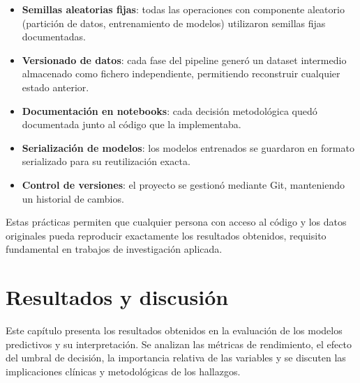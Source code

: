 \documentclass[12pt, a4paper, oneside]{report}
\begin{document}
\begin{itemize}
    \item \textbf{Semillas aleatorias fijas}: todas las operaciones con componente aleatorio (partición de datos, entrenamiento de modelos) utilizaron semillas fijas documentadas.
    \item \textbf{Versionado de datos}: cada fase del pipeline generó un dataset intermedio almacenado como fichero independiente, permitiendo reconstruir cualquier estado anterior.
    \item \textbf{Documentación en notebooks}: cada decisión metodológica quedó documentada junto al código que la implementaba.
    \item \textbf{Serialización de modelos}: los modelos entrenados se guardaron en formato serializado para su reutilización exacta.
    \item \textbf{Control de versiones}: el proyecto se gestionó mediante Git, manteniendo un historial de cambios.
\end{itemize}

Estas prácticas permiten que cualquier persona con acceso al código y los datos originales pueda reproducir exactamente los resultados obtenidos, requisito fundamental en trabajos de investigación aplicada.



\chapter{Resultados y discusión}
\label{chap:resultadosdiscusion}
Este capítulo presenta los resultados obtenidos en la evaluación de los modelos predictivos y su interpretación. Se analizan las métricas de rendimiento, el efecto del umbral de decisión, la importancia relativa de las variables y se discuten las implicaciones clínicas y metodológicas de los hallazgos.
\end{document}
